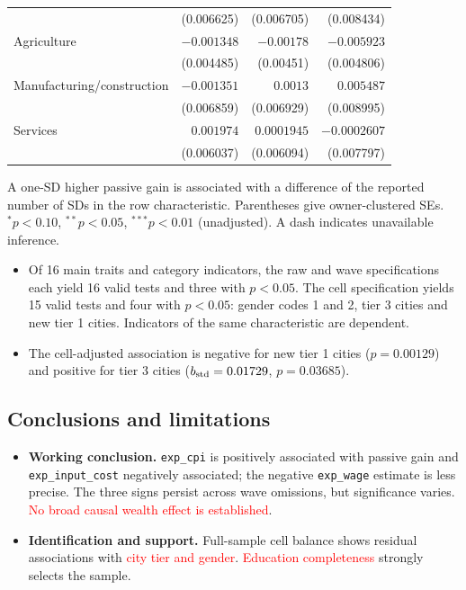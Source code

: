 \documentclass[11pt,letterpaper,english,final]{article}
\begin{document}
\begin{table}[H]
\begin{tabular}{lrrr}
 & (0.006625) & (0.006705) & (0.008434) \\[1pt]
Agriculture & $-0.001348$ & $-0.00178$ & $-0.005923$ \\
 & (0.004485) & (0.00451) & (0.004806) \\[1pt]
Manufacturing/construction & $-0.001351$ & $0.0013$ & $0.005487$ \\
 & (0.006859) & (0.006929) & (0.008995) \\[1pt]
Services & $0.001974$ & $0.0001945$ & $-0.0002607$ \\
 & (0.006037) & (0.006094) & (0.007797) \\[1pt]
\bottomrule
\end{tabular}
\par\vspace{4pt}\begin{minipage}{\linewidth}\footnotesize A one-SD higher passive gain is associated with a difference of the reported number of SDs in the row characteristic. Parentheses give owner-clustered SEs. $^{*}p<0.10$, $^{**}p<0.05$, $^{***}p<0.01$ (unadjusted). A dash indicates unavailable inference.\end{minipage}
\end{table}

\begin{itemize}
\item Of 16 main traits and category indicators, the raw and wave specifications each yield 16 valid tests and three with $p<0.05$. The cell specification yields 15 valid tests and four with $p<0.05$: gender codes 1 and 2, tier 3 cities and new tier 1 cities. Indicators of the same characteristic are dependent.
\item The cell-adjusted association is negative for new tier 1 cities ($p=0.00129$) and positive for tier 3 cities ($b_{\rm std}=0.01729$, $p=0.03685$).
\end{itemize}


\subsection{Conclusions and limitations}
\begin{itemize}
\item \textbf{Working conclusion.} \texttt{exp\_cpi} is positively associated with passive gain and \texttt{exp\_input\_cost} negatively associated; the negative \texttt{exp\_wage} estimate is less precise. The three signs persist across wave omissions, but significance varies. \textcolor{red}{No broad causal wealth effect is established}.

\item \textbf{Identification and support.} Full-sample cell balance shows residual associations with \textcolor{red}{city tier and gender}. \textcolor{red}{Education completeness} strongly selects the sample.
\end{itemize}
\end{document}
